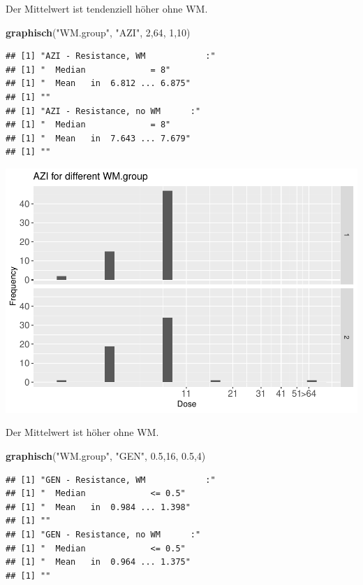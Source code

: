 \documentclass[
]{article}
\newenvironment{Shaded}{\begin{snugshade}}{\end{snugshade}}
\newcommand{\DecValTok}[1]{\textcolor[rgb]{0.00,0.00,0.81}{#1}}
\newcommand{\FloatTok}[1]{\textcolor[rgb]{0.00,0.00,0.81}{#1}}
\newcommand{\KeywordTok}[1]{\textcolor[rgb]{0.13,0.29,0.53}{\textbf{#1}}}
\newcommand{\NormalTok}[1]{#1}
\newcommand{\StringTok}[1]{\textcolor[rgb]{0.31,0.60,0.02}{#1}}
\begin{document}
Der Mittelwert ist tendenziell höher ohne WM.

\begin{Shaded}
\begin{Highlighting}[]
  \KeywordTok{graphisch}\NormalTok{(}\StringTok{"WM.group"}\NormalTok{, }\StringTok{"AZI"}\NormalTok{, }\DecValTok{2}\NormalTok{,}\DecValTok{64}\NormalTok{, }\DecValTok{1}\NormalTok{,}\DecValTok{10}\NormalTok{)}
\end{Highlighting}
\end{Shaded}

\begin{verbatim}
## [1] "AZI - Resistance, WM            :"
## [1] "  Median             = 8"
## [1] "  Mean   in  6.812 ... 6.875"
## [1] ""
## [1] "AZI - Resistance, no WM      :"
## [1] "  Median             = 8"
## [1] "  Mean   in  7.643 ... 7.679"
## [1] ""
\end{verbatim}

\includegraphics{Verteilungen_files/figure-latex/unnamed-chunk-34-1.pdf}

Der Mittelwert ist höher ohne WM.

\begin{Shaded}
\begin{Highlighting}[]
  \KeywordTok{graphisch}\NormalTok{(}\StringTok{"WM.group"}\NormalTok{, }\StringTok{"GEN"}\NormalTok{, }\FloatTok{0.5}\NormalTok{,}\DecValTok{16}\NormalTok{, }\FloatTok{0.5}\NormalTok{,}\DecValTok{4}\NormalTok{)}
\end{Highlighting}
\end{Shaded}

\begin{verbatim}
## [1] "GEN - Resistance, WM            :"
## [1] "  Median             <= 0.5"
## [1] "  Mean   in  0.984 ... 1.398"
## [1] ""
## [1] "GEN - Resistance, no WM      :"
## [1] "  Median             <= 0.5"
## [1] "  Mean   in  0.964 ... 1.375"
## [1] ""
\end{verbatim}
\end{document}
